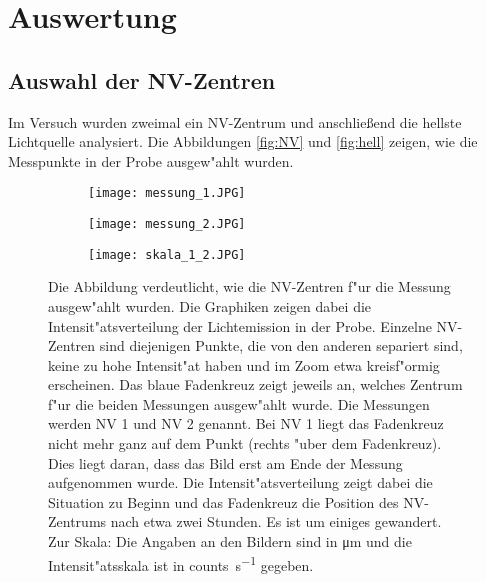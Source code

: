 \section{Auswertung}

\subsection{Auswahl der NV-Zentren}
Im Versuch wurden zweimal ein NV-Zentrum und anschlie\ss end die hellste Lichtquelle analysiert.
Die Abbildungen \vref{fig:NV} und \vref{fig:hell} zeigen, wie die Messpunkte in der Probe ausgew"ahlt wurden.
\begin{figure}[htbp]
    \begin{subfigure}[t][][b]{0.43\textwidth}
        \texttt{[image: messung\_1.JPG]}
        \label{fig:NV:1}
    \end{subfigure}
    \begin{subfigure}[t][][b]{0.42\textwidth}
        \texttt{[image: messung\_2.JPG]}
        \label{fig:NV:2}
    \end{subfigure}
    \hfill
    \begin{subfigure}[t][][b]{0.1\textwidth}
        \texttt{[image: skala\_1\_2.JPG]}
    \end{subfigure}
    \caption{
        Die Abbildung verdeutlicht, wie die NV-Zentren f"ur die Messung ausgew"ahlt wurden.
        Die Graphiken zeigen dabei die Intensit"atsverteilung der Lichtemission in der Probe.
        Einzelne NV-Zentren sind diejenigen Punkte, die von den anderen separiert sind, keine zu hohe Intensit"at haben und im Zoom etwa kreisf"ormig erscheinen.
        Das blaue Fadenkreuz zeigt jeweils an, welches Zentrum f"ur die beiden Messungen ausgew"ahlt wurde.
        Die Messungen werden NV 1 und NV 2 genannt.
        Bei NV 1 liegt das Fadenkreuz nicht mehr ganz auf dem Punkt (rechts "uber dem Fadenkreuz).
        Dies liegt daran, dass das Bild erst am Ende der Messung aufgenommen wurde.
        Die Intensit"atsverteilung zeigt dabei die Situation zu Beginn und das Fadenkreuz die Position des NV-Zentrums nach etwa zwei Stunden.
        Es ist um einiges gewandert.
        \\
        Zur Skala: Die Angaben an den Bildern sind in \si{\micro\metre} und die Intensit"atsskala ist in \si{counts\per\second} gegeben.
        }
    \label{fig:NV}
\end{figure}
